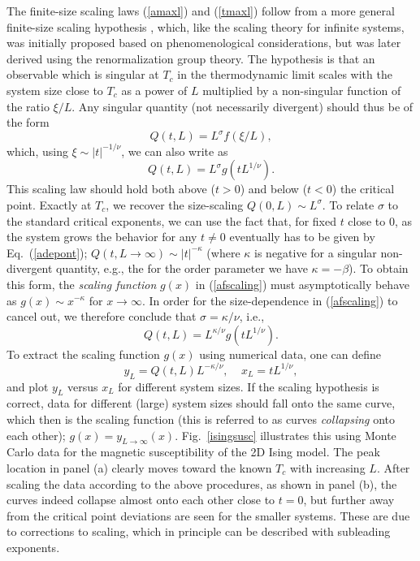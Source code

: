 \documentclass[draft,numberedheadings]{aipproc}
\begin{document}
The finite-size scaling laws (\ref{amaxl}) and (\ref{tmaxl}) follow from a more general finite-size scaling hypothesis \cite{fisher72}, which, like the 
scaling theory for infinite systems, was initially proposed based on phenomenological considerations, but was later derived using the renormalization group 
theory. The hypothesis is that an observable which is singular at $T_c$ in the thermodynamic limit scales with the system size close to $T_c$ as a power of $L$ 
multiplied by a non-singular function of the ratio $\xi/L$. Any singular quantity (not necessarily divergent) should thus be of the form
\begin{equation}
Q(t,L) = L^\sigma f(\xi/L),
\label{fsxilhypo}
\end{equation}
which, using $\xi \sim |t|^{-1/\nu}$, we can also write as
\begin{equation}
Q(t,L) = L^\sigma g(tL^{1/\nu}).
\label{afscaling}
\end{equation}
This scaling law should hold both above ($t>0$) and below ($t<0$) the critical point. Exactly at $T_c$, we recover the size-scaling $Q(0,L) \sim L^\sigma$. To 
relate $\sigma$ to the standard critical exponents, we can use the fact that, for fixed $t$ close to $0$, as the system grows the behavior for any $t\not=0$ 
eventually has to be given by Eq.~(\ref{adepont}); $Q(t,L\to \infty) \sim |t|^{-\kappa}$ (where $\kappa$ is negative for a singular non-divergent quantity, 
e.g., the for the order parameter we have $\kappa=-\beta$). To obtain this form, the {\it scaling function} $g(x)$ in (\ref{afscaling}) must asymptotically 
behave as $g(x) \sim x^{-\kappa}$ for $x \to \infty$. In order for the size-dependence in (\ref{afscaling}) to cancel out, we therefore conclude that 
$\sigma  = \kappa/\nu$, i.e.,
\begin{equation}
Q(t,L) = L^{\kappa/\nu} g(tL^{1/\nu}).
\label{atlscaling}
\end{equation}
To extract the scaling function $g(x)$ using numerical data, one can define
\begin{equation}
y_L=Q(t,L)L^{-\kappa/\nu},~~~~~x_L=tL^{1/\nu},
\label{xlyldef}
\end{equation}
and plot $y_L$ versus $x_L$ for different system sizes. If the scaling hypothesis is correct, data for different (large) system sizes should fall onto the same 
curve, which then is the scaling function (this is referred to as curves {\it collapsing} onto each other); $g(x)=y_{L\to \infty}(x)$. Fig.~\ref{isingsusc} 
illustrates this using Monte Carlo data for the magnetic susceptibility of the 2D Ising model. The peak location in panel (a) clearly moves toward the known 
$T_c$ with increasing $L$. After scaling the data according to the above procedures, as shown in panel (b), the curves indeed  collapse almost onto each other 
close to $t=0$, but further away from the critical point deviations are seen for the smaller systems. These are due to corrections to scaling, which in 
principle can be described with subleading exponents.
\end{document}
